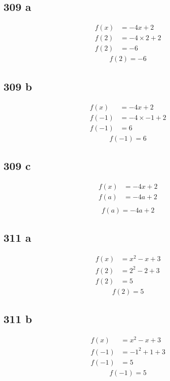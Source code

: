 \documentclass{article}
\begin{document}
    \subsection*{309 a}
    \begin{align*}
        f(x) &= -4x + 2\\
        f(2) &= -4 \times 2 + 2\\
        f(2) &= -6
    \end{align*}
    \begin{align*}
        \boxed{f(2) = -6}
    \end{align*}

    \subsection*{309 b}
    \begin{align*}
        f(x) &= -4x + 2\\
        f(-1) &= -4 \times -1 +2\\
        f(-1) &= 6
    \end{align*}
    \begin{align*}
        \boxed{f(-1) = 6}
    \end{align*}

    \subsection*{309 c}
    \begin{align*}
        f(x) &= -4x + 2\\
        f(a) &= -4a + 2\\
    \end{align*}
    \begin{align*}
        \boxed{f(a) = -4a + 2}
    \end{align*}

    \subsection*{311 a}
    \begin{align*}
        f(x) &= x^2 - x +3 \\
        f(2) &= 2^2 - 2 + 3\\
        f(2) &= 5
    \end{align*}
    \begin{align*}
        \boxed{f(2) = 5}
    \end{align*}

    \subsection*{311 b}
    \begin{align*}
        f(x) &= x^2 - x +3 \\
        f(-1) &= -1^2 + 1 +3\\
        f(-1) &= 5
    \end{align*}
    \begin{align*}
        \boxed{f(-1) = 5}
    \end{align*}
\end{document}
